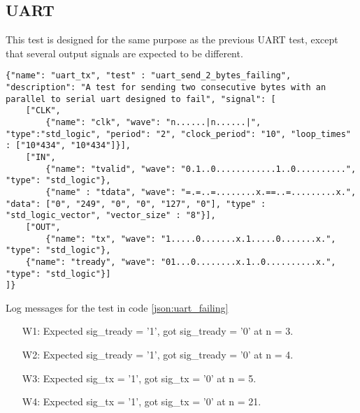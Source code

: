\subsection{UART}
This test is designed for the same purpose as the previous UART test, except that several output signals are expected to be different.
\begin{lstlisting}[style=json, caption={Failing functionality test for the UART design in appendix \ref{appendix:uart}}, label={json:uart_failing}]
{"name": "uart_tx", "test" : "uart_send_2_bytes_failing", "description": "A test for sending two consecutive bytes with an parallel to serial uart designed to fail", "signal": [
	["CLK",
		{"name": "clk", "wave": "n......|n......|", "type":"std_logic", "period": "2", "clock_period": "10", "loop_times" : ["10*434", "10*434"]}],
	["IN",
		{"name": "tvalid", "wave": "0.1..0............1..0..........", "type": "std_logic"},
		{"name" : "tdata", "wave": "=.=..=........x.==..=.........x.", "data": ["0", "249", "0", "0", "127", "0"], "type" : "std_logic_vector", "vector_size" : "8"}],
	["OUT",
		{"name": "tx", "wave": "1.....0.......x.1.....0.......x.", "type": "std_logic"},
	{"name": "tready", "wave": "01...0........x.1..0..........x.", "type": "std_logic"}]
]}
\end{lstlisting}
\begin{customenv}
	\caption{Log messages for the test in code \ref{json:uart_failing}}
	\begin{itemize}
		\centering
		\item [W1:] Expected sig\_tready =  '1',  got sig\_tready =  '0' at n = 3.
		\item [W2:] Expected sig\_tready =  '1',  got sig\_tready =  '0' at n = 4.
		\item [W3:] Expected sig\_tx =  '1',  got sig\_tx =  '0' at n = 5.
		\item [W4:] Expected sig\_tx =  '1',  got sig\_tx =  '0' at n = 21.
	\end{itemize}
\end{customenv}\clearpage\noindent
